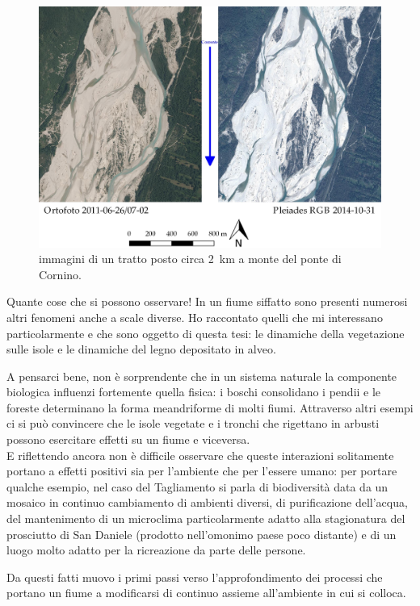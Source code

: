 \begin{figure}
	\centering
	\includegraphics[width=\textwidth]{files/confronto_immagini_erosione_isole.jpeg}
	\caption[immagini di un tratto posto circa \SI{2}{\kilo\m} a monte del ponte di Cornino]{immagini di un tratto posto circa \SI{2}{\kilo\m} a monte del ponte di Cornino.
	}
	\label{fig:confronto-imm-prefaz}
\end{figure}


Quante cose che si possono osservare! In un fiume siffatto sono presenti numerosi altri fenomeni anche a scale diverse.
Ho raccontato quelli che mi interessano particolarmente e che sono oggetto di questa tesi: le dinamiche della vegetazione sulle isole e le dinamiche del legno depositato in alveo.

\medskip
A pensarci bene, non è sorprendente che in un sistema naturale la componente biologica influenzi fortemente quella fisica: i boschi consolidano i pendii e le foreste determinano la forma meandriforme di molti fiumi. Attraverso altri esempi ci si può convincere che le isole vegetate e i tronchi che rigettano in arbusti possono esercitare effetti su un fiume e viceversa. 
\\
E riflettendo ancora non è difficile osservare che queste interazioni solitamente portano a effetti positivi sia per l'ambiente che per l'essere umano: per portare qualche esempio, nel caso del Tagliamento si parla di biodiversità data da un mosaico in continuo cambiamento di ambienti diversi, di purificazione dell'acqua, del mantenimento di un microclima particolarmente adatto alla stagionatura del prosciutto di San Daniele (prodotto nell'omonimo paese poco distante) e di un luogo molto adatto per la ricreazione da parte delle persone.

Da questi fatti muovo i primi passi verso l'approfondimento dei processi che portano un fiume a modificarsi di continuo assieme all'ambiente in cui si colloca.

